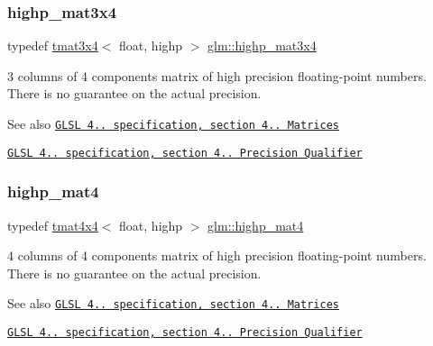 \subsubsection{\texorpdfstring{highp\+\_\+mat3x4}{highp\_mat3x4}}
{\footnotesize\ttfamily typedef \hyperlink{structglm_1_1tmat3x4}{tmat3x4}$<$ float, highp $>$ \hyperlink{group__core__precision_gab51b3b8377cf9462a39a1560333a4215}{glm\+::highp\+\_\+mat3x4}}

3 columns of 4 components matrix of high precision floating-\/point numbers. There is no guarantee on the actual precision.

\begin{DoxySeeAlso}{See also}
\href{http://www.opengl.org/registry/doc/GLSLangSpec.4.20.8.pdf}{\tt G\+L\+SL 4.. specification, section 4.. Matrices} 

\href{http://www.opengl.org/registry/doc/GLSLangSpec.4.20.8.pdf}{\tt G\+L\+SL 4.. specification, section 4.. Precision Qualifier} 
\end{DoxySeeAlso}
\mbox{\label{group__core__precision_ga26f802a535816c7357df06361e695172}} 
\subsubsection{\texorpdfstring{highp\+\_\+mat4}{highp\_mat4}}
{\footnotesize\ttfamily typedef \hyperlink{structglm_1_1tmat4x4}{tmat4x4}$<$ float, highp $>$ \hyperlink{group__core__precision_ga26f802a535816c7357df06361e695172}{glm\+::highp\+\_\+mat4}}

4 columns of 4 components matrix of high precision floating-\/point numbers. There is no guarantee on the actual precision.

\begin{DoxySeeAlso}{See also}
\href{http://www.opengl.org/registry/doc/GLSLangSpec.4.20.8.pdf}{\tt G\+L\+SL 4.. specification, section 4.. Matrices} 

\href{http://www.opengl.org/registry/doc/GLSLangSpec.4.20.8.pdf}{\tt G\+L\+SL 4.. specification, section 4.. Precision Qualifier} 
\end{DoxySeeAlso}
\mbox{\label{group__core__precision_ga289d5d6b112dc6e3f545e7f98d3d0b5c}} 
